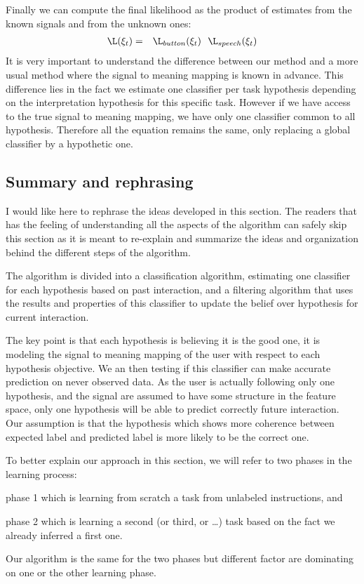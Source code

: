 Finally we can compute the final likelihood as the product of estimates from the known signals and from the unknown ones:
%
\begin{eqnarray}
\L(\xi_t) &=& \L_{button}(\xi_t) ~~ \L_{speech}(\xi_t)
\end{eqnarray}
%
It is very important to understand the difference between our method and a more usual method where the signal to meaning mapping is known in advance. This difference lies in the fact we estimate one classifier per task hypothesis depending on the interpretation hypothesis for this specific task. However if we have access to the true signal to meaning mapping, we have only one classifier common to all hypothesis. Therefore all the equation remains the same, only replacing a global classifier by a hypothetic one.

\subsection{Summary and rephrasing}
\label{chapter:lfui:rephrasing}

I would like here to rephrase the ideas developed in this section. The readers that has the feeling of understanding all the aspects of the algorithm can safely skip this section as it is meant to re-explain and summarize the ideas and organization behind the different steps of the algorithm.

The algorithm is divided into a classification algorithm, estimating one classifier for each hypothesis based on past interaction, and a filtering algorithm that uses the results and properties of this classifier to update the belief over hypothesis for current interaction.

The key point is that each hypothesis is believing it is the good one, it is modeling the signal to meaning mapping of the user with respect to each hypothesis objective. We an then testing if this classifier can make accurate prediction on never observed data. As the user is actually following only one hypothesis, and the signal are assumed to have some structure in the feature space, only one hypothesis will be able to predict correctly future interaction. Our assumption is that the hypothesis which shows more coherence between expected label and predicted label is more likely to be the correct one.

To better explain our approach in this section, we will refer to two phases in the learning process: \begin{inparaenum}[a)] \item phase 1 which is learning from scratch a task from unlabeled instructions, and \item phase 2 which is learning a second (or third, or \ldots) task based on the fact we already inferred a first one. \end{inparaenum} Our algorithm is the same for the two phases but different factor are dominating on one or the other learning phase.

